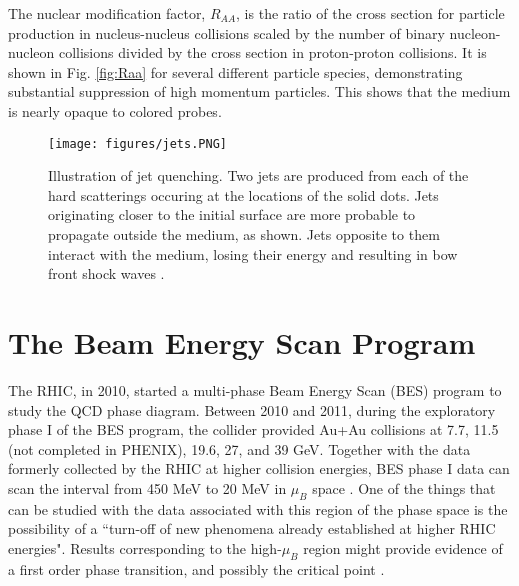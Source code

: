 The nuclear modification factor, $R_{AA}$, is the ratio of the cross section for particle production in nucleus-nucleus collisions scaled by the number of binary nucleon-nucleon collisions divided by the cross section in proton-proton collisions.  It is shown in Fig. \ref{fig:Raa} for several different particle species, demonstrating substantial suppression of high momentum particles. This shows that the medium is nearly opaque to colored probes.

	\begin{figure}[!b]
	  \centering
	  \texttt{[image: figures/jets.PNG]}
	  \caption{Illustration of jet quenching. Two jets are produced from each of the hard scatterings occuring at the locations of the solid dots. Jets originating closer to the initial surface are more probable to propagate outside the medium, as shown. Jets opposite to them interact with the medium, losing their energy and resulting in bow front shock waves \cite{STOCKER2005121}.}\label{fig:jets}
	\end{figure}
	

\section{The Beam Energy Scan Program}
The RHIC, in 2010, started a multi-phase Beam Energy Scan (BES) program to study the QCD phase diagram. Between 2010 and 2011, during the exploratory phase I of the BES program, the collider provided Au+Au collisions at 7.7, 11.5 (not completed in PHENIX), 19.6, 27, and 39 GeV. Together with the data formerly collected by the RHIC at higher collision energies, BES phase I data can scan the interval from 450 MeV to 20 MeV in $\mu_{B}$ space \cite{1742-6596-455-1-012037, LUO201675}. One of the things that can be studied with the data associated with this region of the phase space is the possibility of a ``turn-off of new phenomena already established at higher RHIC energies"\cite{1742-6596-455-1-012037}. Results corresponding to the high-$\mu_{B}$ region might provide evidence of a first order phase transition, and possibly the critical point \cite{LUO201675}.

